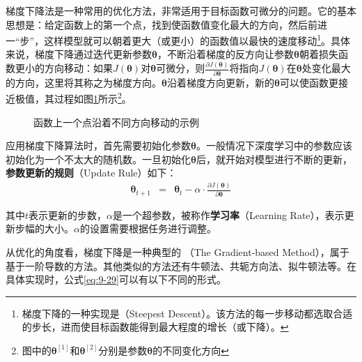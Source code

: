 \parinterval 梯度下降法是一种常用的优化方法，非常适用于目标函数可微分的问题。它的基本思想是：给定函数上的第一个点，找到使函数值变化最大的方向，然后前进一“步”，这样模型就可以朝着更大（或更小）的函数值以最快的速度移动\footnote{梯度下降的一种实现是{\scriptsize{}}（Steepest Descent）。该方法的每一步移动都选取合适的步长，进而使目标函数能得到最大程度的增长（或下降）。}。具体来说，梯度下降通过迭代更新参数$ {\bm \theta} $，不断沿着梯度的反方向让参数$ \bm \theta $朝着损失函数更小的方向移动：如果$ J({\bm \theta}) $对$ \bm \theta $可微分，则$ \frac{\partial J({\bm \theta})}{\partial {\bm \theta}} $将指向$ J({\bm \theta}) $在$ {\bm \theta} $处变化最大的方向，这里将其称之为梯度方向。${\bm \theta}$沿着梯度方向更新，新的${\bm \theta}$可以使函数更接近极值，其过程如图\ref{fig:9-43}所示\footnote{图中的${\bm \theta}^{[1]}$和${\bm \theta}^{[2]}$分别是参数$\bm \theta$的不同变化方向}。

\begin{figure}[htp]
\centering

\caption{函数上一个点沿着不同方向移动的示例}
\label{fig:9-43}
\end{figure}

\parinterval 应用梯度下降算法时，首先需要初始化参数${\bm \theta}$。一般情况下深度学习中的参数应该初始化为一个不太大的随机数。一旦初始化${\bm \theta}$后，就开始对模型进行不断的更新，{\small\sffamily\bfseries{参数更新的规则}}（Update Rule）如下：
\begin{eqnarray}
{\bm \theta}_{t+1}&=&{\bm \theta}_{t}-\alpha \cdot \frac{\partial J({\bm \theta})}{\partial {\bm \theta}}
\label{eq:9-29}
\end{eqnarray}

\noindent 其中$t $表示更新的步数，$ \alpha $是一个超参数，被称作{\small\sffamily\bfseries{学习率}}（Learning Rate），表示更新步幅的大小。$ \alpha $的设置需要根据任务进行调整。

\parinterval 从优化的角度看，梯度下降是一种典型的 {\small{}}（The Gradient-based Method），属于基于一阶导数的方法。其他类似的方法还有牛顿法、共轭方向法、拟牛顿法等。在具体实现时，公式\eqref{eq:9-29}可以有以下不同的形式。\\

%

